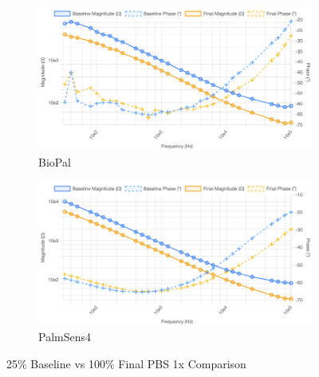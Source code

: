 \begin{figure}[H]
    \centering
    \begin{subfigure}{0.48\textwidth}
        \includegraphics[width=\textwidth]{PBS_25_cropped.png}
        \caption{BioPal}
        \label{fig:25_pbs_biopal}
    \end{subfigure}
    \hfill
    \begin{subfigure}{0.48\textwidth}
        \includegraphics[width=\textwidth]{PalmSens_25.png}
        \caption{PalmSens4}
        \label{fig:25_pbs_palmsens}
    \end{subfigure}
    \caption{25\% Baseline vs 100\% Final PBS 1x Comparison}
    \label{fig:25_pbs_comparison}
\end{figure}
